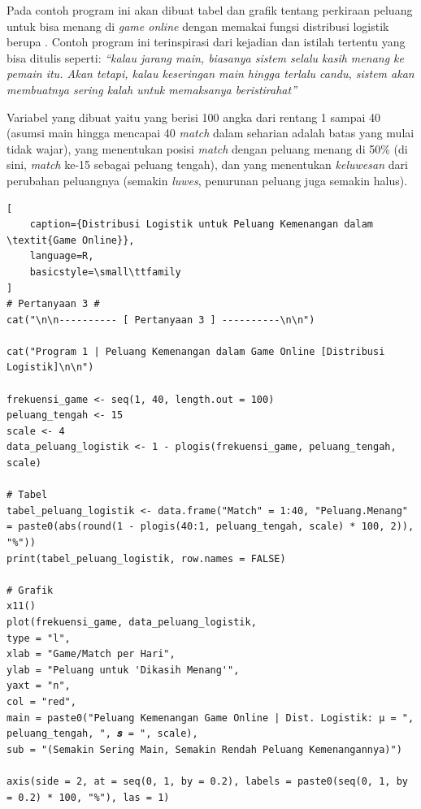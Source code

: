 Pada contoh program ini akan dibuat tabel dan grafik tentang perkiraan peluang untuk bisa menang di \textit{game online} dengan memakai fungsi distribusi logistik berupa . Contoh program ini terinspirasi dari kejadian dan istilah tertentu yang bisa ditulis seperti: \textit{“kalau jarang main, biasanya sistem selalu kasih menang ke pemain itu. Akan tetapi, kalau keseringan main hingga terlalu candu, sistem akan membuatnya sering kalah untuk memaksanya beristirahat”}

Variabel yang dibuat yaitu  yang berisi 100 angka dari rentang 1 sampai 40 (asumsi main hingga mencapai 40 \textit{match} dalam seharian adalah batas yang mulai tidak wajar),  yang menentukan posisi \textit{match} dengan peluang menang di 50\% (di sini, \textit{match} ke-15 sebagai peluang tengah), dan  yang menentukan \textit{keluwesan} dari perubahan peluangnya (semakin \textit{luwes}, penurunan peluang juga semakin halus).

\begin{lstlisting}[
    caption={Distribusi Logistik untuk Peluang Kemenangan dalam \textit{Game Online}}, 
    language=R, 
    basicstyle=\small\ttfamily
]
# Pertanyaan 3 #
cat("\n\n---------- [ Pertanyaan 3 ] ----------\n\n")

cat("Program 1 | Peluang Kemenangan dalam Game Online [Distribusi Logistik]\n\n")

frekuensi_game <- seq(1, 40, length.out = 100)
peluang_tengah <- 15
scale <- 4
data_peluang_logistik <- 1 - plogis(frekuensi_game, peluang_tengah, scale)

# Tabel
tabel_peluang_logistik <- data.frame("Match" = 1:40, "Peluang.Menang" = paste0(abs(round(1 - plogis(40:1, peluang_tengah, scale) * 100, 2)), "%"))
print(tabel_peluang_logistik, row.names = FALSE)

# Grafik
x11()
plot(frekuensi_game, data_peluang_logistik,
type = "l",
xlab = "Game/Match per Hari",
ylab = "Peluang untuk 'Dikasih Menang'",
yaxt = "n",
col = "red",
main = paste0("Peluang Kemenangan Game Online | Dist. Logistik: μ = ", peluang_tengah, ", 𝒔 = ", scale),
sub = "(Semakin Sering Main, Semakin Rendah Peluang Kemenangannya)")

axis(side = 2, at = seq(0, 1, by = 0.2), labels = paste0(seq(0, 1, by = 0.2) * 100, "%"), las = 1)
\end{lstlisting}

